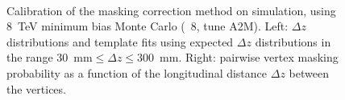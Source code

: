 \begin{enumerate}
\begin{figure}[htbp]
	\centering
	\\
	\caption{Calibration of the masking correction method on simulation, using 8~TeV minimum bias Monte Carlo (\pythia~8, tune A2M). Left: $\Delta z$ distributions and template fits using expected $\Delta z$ distributions in the range $30$~mm$\leq\Delta z\leq300$~mm. Right: pairwise vertex masking probability as a function of the longitudinal distance $\Delta z$ between the vertices.}
	\label{fig:masking-correction-mc}
\end{figure}



\end{enumerate}
